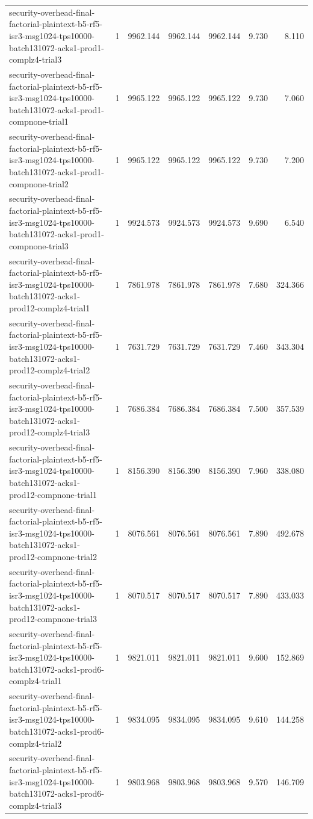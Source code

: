 \begin{tabular}{lrrrrrr}
security-overhead-final-factorial-plaintext-b5-rf5-isr3-msg1024-tps10000-batch131072-acks1-prod1-complz4-trial3 & 1 & 9962.144 & 9962.144 & 9962.144 & 9.730 & 8.110 \\
security-overhead-final-factorial-plaintext-b5-rf5-isr3-msg1024-tps10000-batch131072-acks1-prod1-compnone-trial1 & 1 & 9965.122 & 9965.122 & 9965.122 & 9.730 & 7.060 \\
security-overhead-final-factorial-plaintext-b5-rf5-isr3-msg1024-tps10000-batch131072-acks1-prod1-compnone-trial2 & 1 & 9965.122 & 9965.122 & 9965.122 & 9.730 & 7.200 \\
security-overhead-final-factorial-plaintext-b5-rf5-isr3-msg1024-tps10000-batch131072-acks1-prod1-compnone-trial3 & 1 & 9924.573 & 9924.573 & 9924.573 & 9.690 & 6.540 \\
security-overhead-final-factorial-plaintext-b5-rf5-isr3-msg1024-tps10000-batch131072-acks1-prod12-complz4-trial1 & 1 & 7861.978 & 7861.978 & 7861.978 & 7.680 & 324.366 \\
security-overhead-final-factorial-plaintext-b5-rf5-isr3-msg1024-tps10000-batch131072-acks1-prod12-complz4-trial2 & 1 & 7631.729 & 7631.729 & 7631.729 & 7.460 & 343.304 \\
security-overhead-final-factorial-plaintext-b5-rf5-isr3-msg1024-tps10000-batch131072-acks1-prod12-complz4-trial3 & 1 & 7686.384 & 7686.384 & 7686.384 & 7.500 & 357.539 \\
security-overhead-final-factorial-plaintext-b5-rf5-isr3-msg1024-tps10000-batch131072-acks1-prod12-compnone-trial1 & 1 & 8156.390 & 8156.390 & 8156.390 & 7.960 & 338.080 \\
security-overhead-final-factorial-plaintext-b5-rf5-isr3-msg1024-tps10000-batch131072-acks1-prod12-compnone-trial2 & 1 & 8076.561 & 8076.561 & 8076.561 & 7.890 & 492.678 \\
security-overhead-final-factorial-plaintext-b5-rf5-isr3-msg1024-tps10000-batch131072-acks1-prod12-compnone-trial3 & 1 & 8070.517 & 8070.517 & 8070.517 & 7.890 & 433.033 \\
security-overhead-final-factorial-plaintext-b5-rf5-isr3-msg1024-tps10000-batch131072-acks1-prod6-complz4-trial1 & 1 & 9821.011 & 9821.011 & 9821.011 & 9.600 & 152.869 \\
security-overhead-final-factorial-plaintext-b5-rf5-isr3-msg1024-tps10000-batch131072-acks1-prod6-complz4-trial2 & 1 & 9834.095 & 9834.095 & 9834.095 & 9.610 & 144.258 \\
security-overhead-final-factorial-plaintext-b5-rf5-isr3-msg1024-tps10000-batch131072-acks1-prod6-complz4-trial3 & 1 & 9803.968 & 9803.968 & 9803.968 & 9.570 & 146.709 \\

\end{tabular}
